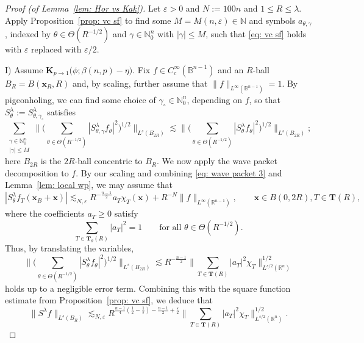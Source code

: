 \documentclass[reqno]{amsart}
\numberwithin{equation}{section}
\newcommand{\B}{\mathbb{B}}
\newcommand{\N}{\mathbb{N}}
\newcommand{\R}{\mathbb{R}}
\newcommand{\bx}{\mathbf{x}}
\newcommand{\bK}{\mathbf{K}}
\newcommand{\bT}{\mathbf{T}}
\theoremstyle{plain}
\theoremstyle{definition}
\begin{document}
\begin{proof}[Proof (of Lemma~\ref{lem: Hor vs Kak})]  Let $\varepsilon > 0$ and $N := 100n$ and $1 \leq R \leq \lambda$. Apply Proposition~\ref{prop: vc sf} to find some $M = M(n,\varepsilon) \in \N$ and symbols $a_{\theta,\gamma}$, indexed by $\theta \in \Theta(R^{-1/2})$ and $\gamma \in \N_0^n$ with $|\gamma| \leq M$, such that \eqref{eq: vc sf} holds with $\varepsilon$ replaced with $\varepsilon/2$. \medskip

\noindent I) Assume $\bK_{p \to 1}\big(\phi;  \beta(n, p) - \eta\big)$. Fix $f \in C^{\infty}_c(\B^{n-1})$ and an $R$-ball $B_R = B(\bx_R, R)$ and, by scaling, further assume that $\|f\|_{L^{\infty}(\B^{n-1})} = 1$. By pigeonholing, we can find some choice of $\gamma_{\circ} \in \N^n_0$, depending on $f$, so that $S_{\theta}^{\lambda} := S_{\theta,\gamma_{\circ}}^{\lambda}$ satisfies 
\begin{equation*}
    \sum_{\substack{\gamma \in \N_0^n \\ |\gamma| \leq M}} \Big\|\big(\sum_{\theta \in \Theta(R^{-1/2})} |S_{\theta,\gamma}^{\lambda}f_{\theta}|^2 \big)^{1/2}\Big\|_{L^s(B_{2R})} \lesssim \Big\|\big(\sum_{\theta \in \Theta(R^{-1/2})} |S_{\theta}^{\lambda}f_{\theta}|^2 \big)^{1/2}\Big\|_{L^s(B_{2R})};
\end{equation*}
here $B_{2R}$ is the $2R$-ball concentric to $B_R$. We now apply the wave packet decomposition to $f$. By our scaling and combining \eqref{eq: wave packet 3} and Lemma~\ref{lem: local wp}, we may assume that
\begin{equation*}
|S_{\theta}^{\lambda}f_T(\bx_B + \bx)| 
    \lesssim_{N, \varepsilon} R^{-\frac{n-1}{2}}a_T \chi_T(\bx) + R^{-N}\|f\|_{L^{\infty}(\R^{n-1})},\qquad \bx \in B(0,2R), T \in \bT(R),
\end{equation*}
where the coefficients $a_T \geq 0$ satisfy
\begin{equation*}
    \sum_{T \in \bT_{\theta}(R)} |a_T|^2 = 1 \qquad \textrm{for all $\theta \in \Theta(R^{-1/2})$.}
\end{equation*}
Thus, by translating the variables, 
\begin{equation*}
    \Big\|\big(\sum_{\theta \in \Theta(R^{-1/2})} |S_{\theta}^{\lambda}f_{\theta}|^2 \big)^{1/2}\Big\|_{L^s(B_{2R})} \lesssim  R^{-\frac{n-1}{2}} \Big\|\sum_{T \in \bT(R)} |a_T|^2\chi_T \Big\|_{L^{s/2}(\R^n)}^{1/2}
\end{equation*}
holds up to a negligible error term. Combining this with the square function estimate from Proposition~\ref{prop: vc sf}, we deduce that
\begin{equation}\label{eq: osc vs geom 1}
    \|S^{\lambda}f\|_{L^s(B_R)} \lesssim_{N, \varepsilon} R^{\frac{n-1}{4}(\frac{1}{2} - \frac{1}{s}) - \frac{n-1}{2} + \frac{\varepsilon}{2}} \Big\|\sum_{T \in \bT(R)} |a_T|^2\chi_T \Big\|_{L^{s/2}(\R^n)}^{1/2}.
\end{equation}


\end{proof}
\end{document}
